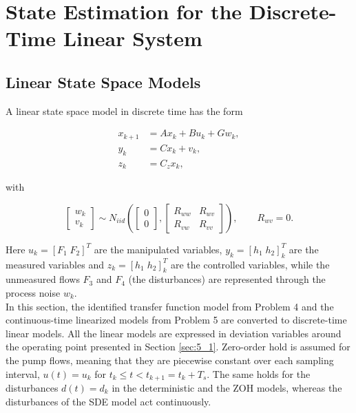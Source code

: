 \chapter{State Estimation for the Discrete-Time Linear System}

\section{Linear State Space Models}
\label{sec:6_1}


A linear state space model in discrete time has the form

\begin{align}
    x_{k+1} &= A x_k + B u_k + G w_k, \label{eq:ss-state}\\
    y_k     &= C x_k + v_k, \label{eq:ss-meas}\\
    z_k     &= C_z x_k, \label{eq:ss-out}
\end{align}

with

\begin{equation}
  \begin{bmatrix} w_k \\ v_k \end{bmatrix} \sim N_{iid}\!\left(
  \begin{bmatrix} 0 \\ 0 \end{bmatrix},
  \begin{bmatrix} R_{ww} & R_{wv} \\ R_{vw} & R_{vv} \end{bmatrix}\right),
  \qquad R_{wv}=0 .
\end{equation}

Here $u_k = [F_1 \; F_2]^T$ are the manipulated variables, $y_k = [h_1 \; h_2]_k^T$ are the measured variables and $z_k = [h_1 \; h_2]_k^T$ are the controlled variables, while the unmeasured flows $F_3$ and $F_4$ (the disturbances) are represented through the process noise $w_k$.\\

In this section, the identified transfer function model from Problem 4 and the continuous-time linearized models from Problem 5 are converted to discrete-time linear models. All the linear models are expressed in deviation variables around the operating point presented in Section \ref{sec:5_1}. Zero-order hold is assumed for the pump flows, meaning that they are piecewise constant over each sampling interval, $u(t)=u_k$ for $t_k\le t<t_{k+1}=t_k+T_s$. The same holds for the disturbances $d(t)=d_k$ in the deterministic and the ZOH models, whereas the disturbances of the SDE model act continuously.

